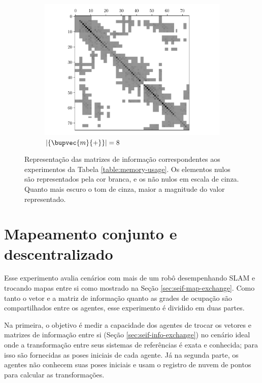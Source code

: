 \begin{figure}
\begin{subfigure}{0.49\textwidth}
    \includegraphics[width=\textwidth]{figs/seif-8-info-matrix.pdf} 
    \caption{$\lvert\{ \bupvec{m}{+} \}\rvert = 8$}
    \label{fig:seif-info-matrix-08}
  \end{subfigure}
  \caption{Representação das matrizes de informação correspondentes aos experimentos da Tabela \ref{table:memory-usage}. Os elementos nulos são representados pela cor branca, e os não nulos em escala de cinza. Quanto mais escuro o tom de cinza, maior a magnitude do valor representado.}
  \label{fig:seif-info-matrix-memory}
\end{figure}


\section{Mapeamento conjunto e descentralizado}
Esse experimento avalia cenários com mais de um robô desempenhando SLAM 
e trocando mapas entre si como mostrado na Seção \ref{sec:seif-map-exchange}. Como tanto o vetor e a matriz de informação 
quanto as grades de ocupação são compartilhados entre os agentes, esse 
experimento é dividido em duas partes.

Na primeira, o objetivo é medir a 
capacidade dos agentes de trocar os vetores e matrizes de informação 
entre si (Seção \ref{sec:seif-info-exchange}) no cenário ideal onde a
transformação entre seus sistemas de referências é exata e conhecida; para isso são fornecidas as poses iniciais de cada agente. Já 
na segunda parte, os agentes não conhecem suas poses iniciais e usam o 
registro de nuvem de pontos para calcular as transformações.

